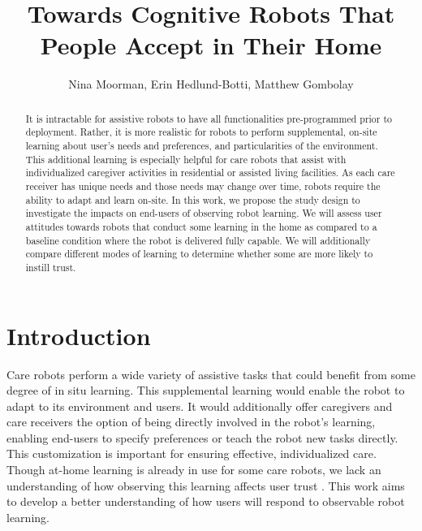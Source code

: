\documentclass[letterpaper]{article} %
\title{Towards Cognitive Robots That People Accept in Their Home}
\author {
    Nina Moorman, %
    Erin Hedlund-Botti, %
    Matthew Gombolay %
}
\begin{document}
\maketitle

\begin{abstract}
It is intractable for assistive robots to have all functionalities pre-programmed prior to deployment. Rather, it is more realistic for robots to perform supplemental, on-site learning about user's needs and preferences, and  particularities of the environment. This additional learning is especially helpful for care robots that assist with individualized caregiver activities in residential or assisted living facilities. As each care receiver has unique needs and those needs may change over time, robots require the ability to adapt and learn on-site. In this work, we propose the study design to investigate the impacts on end-users of observing robot learning. We will assess user attitudes towards robots that conduct some learning in the home as compared to a baseline condition where the robot is delivered fully capable. We will additionally compare different modes of learning to determine whether some are more likely to instill trust.
\end{abstract}


\section{Introduction}
\label{sec:introduction}
Care robots perform a wide variety of assistive tasks that could benefit from some degree of in situ learning. This supplemental learning would enable the robot to adapt to its environment and users. It would additionally offer caregivers and care receivers the option of being directly involved in the robot's learning, enabling end-users to specify preferences or teach the robot new tasks directly. This customization is important for ensuring effective, individualized care. Though at-home learning is already in use for some care robots, we lack an understanding of how observing this learning affects user trust \cite{irobot_irobot_nodate, moxi, paro}. This work aims to develop a better understanding of how users will respond to observable robot learning.
\end{document}
